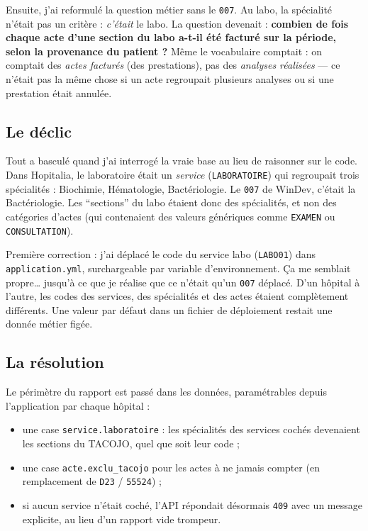 \documentclass[10pt,twoside,openany]{article}
\begin{document}
Ensuite, j'ai reformulé la question métier sans le \texttt{007}. Au labo, la spécialité n'était pas un critère : \textit{c'était} le labo. La question devenait : \textbf{combien de fois chaque acte d'une section du labo a-t-il été facturé sur la période, selon la provenance du patient ?} Même le vocabulaire comptait : on comptait des \textit{actes facturés} (des prestations), pas des \textit{analyses réalisées} --- ce n'était pas la même chose si un acte regroupait plusieurs analyses ou si une prestation était annulée.

\subsection*{Le déclic}
Tout a basculé quand j'ai interrogé la vraie base au lieu de raisonner sur le code. Dans Hopitalia, le laboratoire était un \textit{service} (\texttt{LABORATOIRE}) qui regroupait trois spécialités : Biochimie, Hématologie, Bactériologie. Le \texttt{007} de WinDev, c'était la Bactériologie. Les \enquote{sections} du labo étaient donc des spécialités, et non des catégories d'actes (qui contenaient des valeurs génériques comme \texttt{EXAMEN} ou \texttt{CONSULTATION}).

Première correction : j'ai déplacé le code du service labo (\texttt{LABO01}) dans \texttt{application.yml}, surchargeable par variable d'environnement. Ça me semblait propre\dots{} jusqu'à ce que je réalise que ce n'était qu'un \texttt{007} déplacé. D'un hôpital à l'autre, les codes des services, des spécialités et des actes étaient complètement différents. Une valeur par défaut dans un fichier de déploiement restait une donnée métier figée.

\subsection*{La résolution}
Le périmètre du rapport est passé dans les données, paramétrables depuis l'application par chaque hôpital :
\begin{itemize}
  \item une case \texttt{service.laboratoire} : les spécialités des services cochés devenaient les sections du TACOJO, quel que soit leur code ;
  \item une case \texttt{acte.exclu\_tacojo} pour les actes à ne jamais compter (en remplacement de \texttt{D23} / \texttt{55524}) ;
  \item si aucun service n'était coché, l'API répondait désormais \texttt{409} avec un message explicite, au lieu d'un rapport vide trompeur.
\end{itemize}
\end{document}
